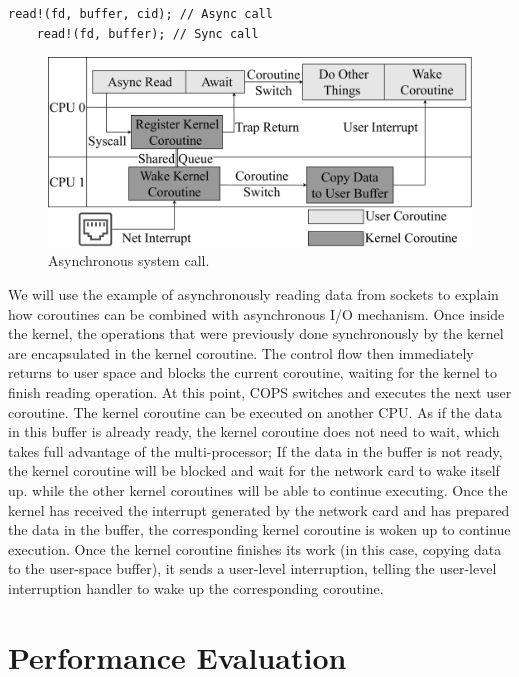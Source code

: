 \documentclass[sigconf,review,anonymous]{acmart}
\begin{document}
\begin{lstlisting}[label={system call}, caption={System call interface of read().}]
    read!(fd, buffer, cid); // Async call
    read!(fd, buffer); // Sync call
\end{lstlisting}

\begin{figure}[h]
  \centering
  \includegraphics[width=\linewidth]{assets/async_syscall.pdf}
  \caption{Asynchronous system call.}
  \label{fig:async_syscall}
\end{figure}

We will use the example of asynchronously reading data from sockets to explain how coroutines can be combined with asynchronous I/O mechanism. Once inside the kernel, the operations that were previously done synchronously by the kernel are encapsulated in the kernel coroutine. The control flow then immediately returns to user space and blocks the current coroutine, waiting for the kernel to finish reading operation. At this point, COPS switches and executes the next user coroutine. The kernel coroutine can be executed on another CPU. As if the data in this buffer is already ready, the kernel coroutine does not need to wait, which takes full advantage of the multi-processor; If the data in the buffer is not ready, the kernel coroutine will be blocked and wait for the network card to wake itself up. while the other kernel coroutines will be able to continue executing. Once the kernel has received the interrupt generated by the network card and has prepared the data in the buffer, the corresponding kernel coroutine is woken up to continue execution. Once the kernel coroutine finishes its work (in this case, copying data to the user-space buffer), it sends a user-level interruption, telling the user-level interruption handler to wake up the corresponding coroutine.

\section{Performance Evaluation}
\end{document}
